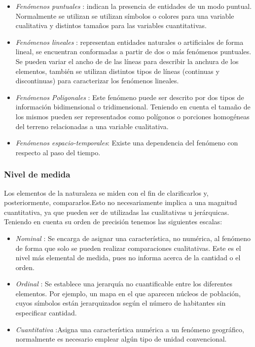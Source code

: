 \begin{itemize}
    \item \textit{Fenómenos puntuales} : indican la presencia de entidades de un modo puntual. Normalmente se utilizan se utilizan símbolos o colores para una variable cualitativa y distintos tamaños para las variables cuantitativas.

    \item \textit{Fenómenos lineales} : representan entidades naturales o artificiales de forma lineal, se encuentran conformadas a partir de dos o más fenómenos puntuales. Se pueden variar el ancho de de las líneas para describir la anchura de los elementos, también se utilizan distintos tipos de líneas (continuas y discontinuas) para caracterizar los fenómenos lineales.

    \item \textit{Fenómenos Poligonales} : Este fenómeno puede ser descrito por dos tipos de información bidimensional o tridimensional. Teniendo en cuenta el tamaño de los mismos pueden ser representados como polígonos o porciones homogéneas del terreno relacionadas a una variable cualitativa.

    \item \textit{Fenómenos espacio-temporales}: Existe una dependencia del fenómeno con respecto al paso del tiempo.
\end{itemize}

\subsubsection{Nivel de medida}

Los elementos de la naturaleza se miden con el fin de clarificarlos y, posteriormente, compararlos.Esto no necesariamente implica a una magnitud cuantitativa, ya que pueden ser de utilizadas las cualitativas u jerárquicas\citep{fomentoConceptos2010}. Teniendo en cuenta su orden de precisión tenemos las siguientes escalas:

\begin{itemize}
    \item \textit{Nominal} : Se encarga de asignar una característica, no numérica, al fenómeno de forma que solo se pueden realizar comparaciones cualitativas. Este es el nivel más elemental de medida, pues no informa acerca de la cantidad o el orden.

    \item \textit{Ordinal} : Se establece una jerarquía no cuantificable entre los diferentes elementos. Por ejemplo, un mapa en el que aparecen núcleos de población, cuyos símbolos están jerarquizados según el número de habitantes sin especificar cantidad.

    \item \textit{Cuantitativa} :Asigna una característica numérica a un fenómeno geográfico, normalmente es necesario emplear algún tipo de unidad convencional.
\end{itemize}

